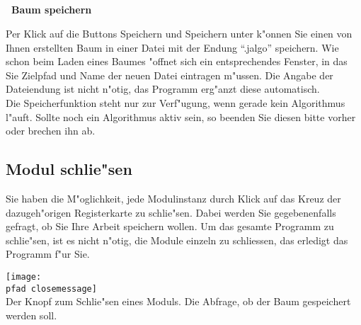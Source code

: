 \medskip
\subsection[Baum speichern]{}
\vspace{-4.3ex} {\bf {\large \qquad \qquad \quad \ Baum speichern}} 


Per Klick auf die Buttons {\sc Speichern} und {\sc Speichern unter} k"onnen Sie einen von Ihnen erstellten Baum in einer 
Datei mit der Endung "`.jalgo"' speichern. Wie schon beim Laden eines Baumes "offnet sich ein entsprechendes Fenster, 
in das Sie Zielpfad und Name der neuen Datei eintragen m"ussen. Die Angabe der Dateiendung ist nicht n"otig, das Programm 
erg"anzt diese automatisch. \\
Die Speicherfunktion steht nur zur Verf"ugung, wenn gerade kein Algorithmus l"auft. Sollte noch ein Algorithmus aktiv sein, 
so beenden Sie diesen bitte vorher oder brechen ihn ab.


\medskip
\subsection{Modul schlie"sen}


Sie haben die M"oglichkeit, jede Modulinstanz durch Klick auf das Kreuz der dazugeh"origen Registerkarte zu schlie"sen. 
Dabei werden Sie gegebenenfalls gefragt, ob Sie Ihre Arbeit speichern wollen. 
Um das gesamte Programm zu schlie"sen, ist es nicht n"otig, die Module einzeln zu schliessen, das erledigt das Programm 
f"ur Sie.

\bigskip
\begin{center}
	 \hfill
	\texttt{[image: \\pfad closemessage]} \\
	{\small Der Knopf zum Schlie"sen eines Moduls.} \hfill
	{\small Die Abfrage, ob der Baum gespeichert werden soll.}
\end{center}
\bigskip
\bigskip